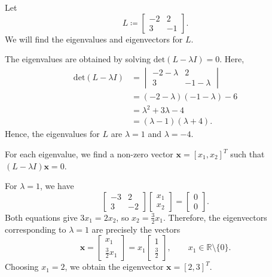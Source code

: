 \begin{example}
	Let
	\begin{equation}
		L \coloneq \begin{bmatrix} -2 & 2\\ 3 & -1 \end{bmatrix}.
		\label{eq:eigenvalue-example-1}
	\end{equation}
	We will find the eigenvalues and eigenvectors for \( L \).

	The eigenvalues are obtained by solving \( \mathrm{det}(L - \lambda I) = 0 \). Here,
	\begin{equation}
		\begin{aligned}
			\mathrm{det}(L - \lambda I)
			 & = \begin{vmatrix} -2 - \lambda & 2\\ 3 & -1 - \lambda \end{vmatrix} \\
			 & = (-2 - \lambda)(-1 - \lambda) - 6                                  \\
			 & = \lambda^2 + 3\lambda - 4                                          \\
			 & = (\lambda - 1)(\lambda + 4).
		\end{aligned}
		\label{eq:eigenvalue-example-2}
	\end{equation}
	Hence, the eigenvalues for \( L \) are \( \lambda = 1 \) and \( \lambda = -4 \).

	For each eigenvalue, we find a non-zero vector \( \mathbf{x} = [x_1, x_2]^T \) such that \( (L - \lambda I)\mathbf{x} = 0 \).

	For \( \lambda = 1 \), we have
	\begin{equation}
		\begin{bmatrix} -3 & 2\\ 3 & -2 \end{bmatrix}
		\begin{bmatrix} x_1\\ x_2 \end{bmatrix}
		= \begin{bmatrix} 0\\ 0 \end{bmatrix}.
		\label{eq:eigenvalue-example-3}
	\end{equation}
	Both equations give \( 3x_1 = 2x_2 \), so \( x_2 = \frac{3}{2}x_1 \). Therefore, the eigenvectors corresponding to \( \lambda = 1 \) are precisely the vectors
	\begin{equation}
		\mathbf{x}
		= \begin{bmatrix} x_1\\ \frac{3}{2}x_1 \end{bmatrix}
		= x_1 \begin{bmatrix} 1\\ \frac{3}{2} \end{bmatrix},
		\qquad x_1 \in \mathbb{R} \setminus \{0\}.
		\label{eq:eigenvalue-example-4}
	\end{equation}
	Choosing \( x_1 = 2 \), we obtain the eigenvector \( \mathbf{x} = [2,3]^T \).


\end{example}

